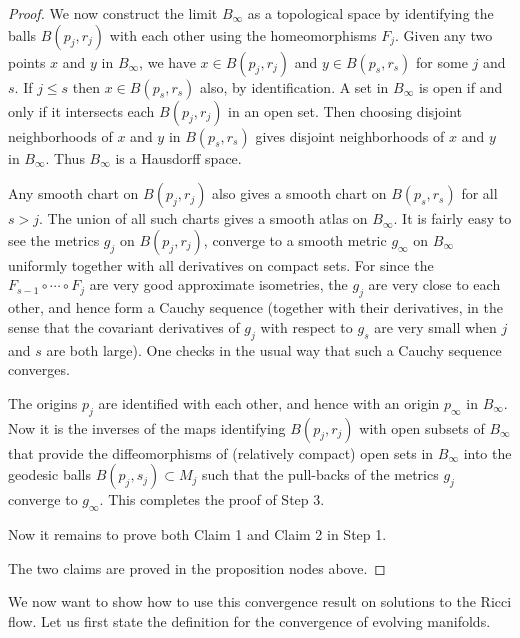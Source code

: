 \begin{proof}
We now construct the limit $B_{\infty}$ as a topological space by
identifying the balls $B(p_j,r_j)$ with each other using the
homeomorphisms $F_j$. Given any two points $x$ and $y$ in
$B_{\infty}$, we have $x \in B(p_j,r_j)$ and $y \in B(p_s,r_s)$
for some $j$ and $s$. If $j \leq s$ then $x \in B(p_s,r_s)$ also,
by identification. A set in $B_{\infty}$ is open if and only if it
intersects each $B(p_j,r_j)$ in an open set. Then choosing
disjoint neighborhoods of $x$ and $y$ in $B(p_s,r_s)$ gives
disjoint neighborhoods of $x$ and $y$ in $B_{\infty}$. Thus
$B_{\infty}$ is a Hausdorff space.

Any smooth chart on $B(p_j,r_j)$ also gives a smooth chart on
$B(p_s,r_s)$ for all $s > j$. The union of all such charts gives a
smooth atlas on $B_{\infty}$. It is fairly easy to see the metrics
$g_j$ on $B(p_j,r_j)$, converge to a smooth metric $g_{\infty}$ on
$B_{\infty}$ uniformly together with all derivatives on compact
sets. For since the $F_{s-1} \circ \cdots \circ F_j$ are very good
approximate isometries, the $g_j$ are very close to each other,
and hence form a Cauchy sequence (together with their derivatives,
in the sense that the covariant derivatives of $g_j$ with respect
to $g_s$ are very small when $j$ and $s$ are both large). One
checks in the usual way that such a Cauchy sequence converges.

The origins $p_j$ are identified with each other, and hence with
an origin $p_{\infty}$ in $B_{\infty}$. Now it is the inverses of
the maps identifying $B(p_j,r_j)$ with open subsets of
$B_{\infty}$ that provide the diffeomorphisms of (relatively
compact) open sets in $B_{\infty}$ into the geodesic balls
$B(p_j,s_j) \subset M_j$ such that the pull-backs of the metrics
$g_j$ converge to $g_{\infty}$. This completes the proof of Step
3.

\medskip
Now it remains to prove both Claim 1 and Claim 2 in Step 1.

The two claims are proved in the proposition nodes above.

\end{proof}

We now want to show how to use this convergence result on
solutions to the Ricci flow. Let us first state the definition for
the convergence of evolving manifolds.

